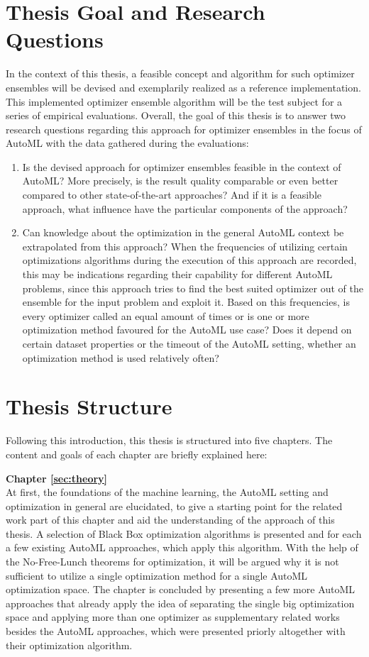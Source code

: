 \section{Thesis Goal and Research Questions}
\label{sec:intro:goal}
In the context of this thesis, a feasible concept and algorithm for such optimizer ensembles will be devised and exemplarily realized as a reference implementation.
This  implemented optimizer ensemble algorithm will be the test subject for a series of empirical evaluations.
Overall, the goal of this thesis is to answer two research questions regarding this approach for optimizer ensembles in the focus of AutoML with the data gathered during the evaluations:
\begin{enumerate}
    \item Is the devised approach for optimizer ensembles feasible in the context of AutoML?
    More precisely, is the result quality comparable or even better compared to other state-of-the-art approaches?
    And if it is a feasible approach, what influence have the particular components of the approach?
    \item Can knowledge about the optimization in the general AutoML context be extrapolated from this approach?
    When the frequencies of utilizing certain optimizations algorithms during the execution of this approach are recorded, this may be indications regarding their capability for different AutoML problems, since this approach tries to find the best suited optimizer out of the ensemble for the input problem and exploit it.
    Based on this frequencies, is every optimizer called an equal amount of times or is one or more optimization method favoured for the AutoML use case?
    Does it depend on certain dataset properties or the timeout of the AutoML setting, whether an optimization method is used relatively often?
\end{enumerate}

\section{Thesis Structure}
\label{sec:intro:structure}
Following this introduction, this thesis is structured into five chapters.
The content and goals of each chapter are briefly explained here:

\textbf{Chapter \ref{sec:theory}} \\[0.2em]
At first, the foundations of the machine learning, the AutoML setting and optimization in general are elucidated, to give a starting point for the related work part of this chapter and aid the understanding of the approach of this thesis.
A selection of Black Box optimization algorithms is presented and for each a few existing AutoML approaches, which apply this algorithm.
With the help of the No-Free-Lunch theorems for optimization, it will be argued why it is not sufficient to utilize a single optimization method for a single AutoML optimization space.
The chapter is concluded by presenting a few more AutoML approaches that already apply the idea of separating the single big optimization space and applying more than one optimizer as supplementary related works besides the AutoML approaches, which were presented priorly altogether with their optimization algorithm.

